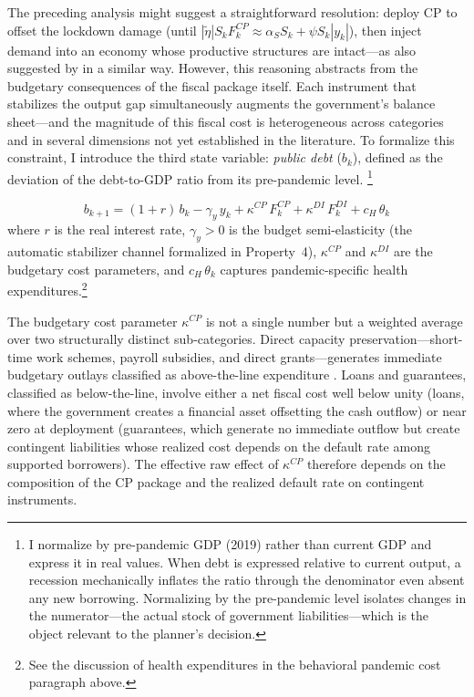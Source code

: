\documentclass[12pt, a4paper]{article}
\begin{document}
The preceding analysis might suggest a straightforward resolution: deploy CP to offset the lockdown damage (until $|\tilde{\eta}| S_k F_k^{CP} \approx \alpha_S S_k + \psi S_k |y_k|$), then inject demand into an economy whose productive structures are intact---as also suggested by \citet{deb2021} in a similar way. However, this reasoning abstracts from the budgetary consequences of the fiscal package itself. Each instrument that stabilizes the output gap simultaneously augments the government's balance sheet---and the magnitude of this fiscal cost is heterogeneous across categories and in several dimensions not yet established in the literature. To formalize this constraint, I introduce the third state variable: \textit{public debt} ($b_k$), defined as the deviation of the debt-to-GDP ratio from its pre-pandemic level. \footnote{I normalize by pre-pandemic GDP (2019) rather than current GDP and express it in real values. When debt is expressed relative to current output, a recession mechanically inflates the ratio through the denominator even absent any new borrowing. Normalizing by the pre-pandemic level isolates changes in the numerator---the actual stock of government liabilities---which is the object relevant to the planner's decision.}

%
\begin{equation}
    b_{k+1} = (1+r)\, b_k - \gamma_y\, y_k + \kappa^{CP}\, F^{CP}_k + \kappa^{DI}\, F^{DI}_k + c_H\, \theta_k
    \label{eq:debt}
\end{equation}
%
where $r$ is the real interest rate, $\gamma_y > 0$ is the budget semi-elasticity (the automatic stabilizer channel formalized in Property~4), $\kappa^{CP}$ and $\kappa^{DI}$ are the budgetary cost parameters, and $c_H\, \theta_k$ captures pandemic-specific health expenditures.\footnote{See the discussion of health expenditures 
in the behavioral pandemic cost paragraph above.}

The budgetary cost parameter $\kappa^{CP}$ is not a single number but a weighted average over two structurally distinct sub-categories. Direct capacity preservation---short-time work schemes, payroll subsidies, and direct grants---generates immediate budgetary outlays classified as above-the-line expenditure \citep{imf2022fiscalmonitor}. Loans and guarantees, classified as below-the-line, involve either a net fiscal cost well below unity (loans, where the government creates a financial asset offsetting the cash outflow) or near zero at deployment (guarantees, which generate no immediate outflow but create contingent liabilities whose realized cost depends on the default rate among supported borrowers). The effective raw effect of $\kappa^{CP}$ therefore depends on the composition of the CP package and the realized default rate on contingent instruments.
\end{document}
